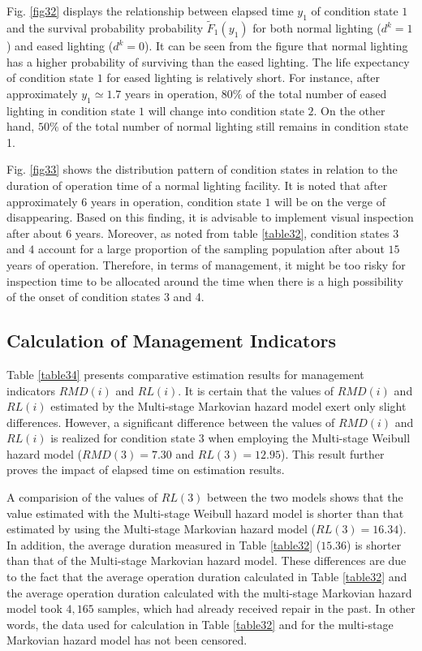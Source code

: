 Fig. \ref{fig32} displays the relationship between elapsed time $y_1$ of condition state $1$ and the survival probability probability $\tilde{F}_1(y_1)$ for both normal lighting ($d^k=1$) and eased lighting ($d^k=0$). It can be seen from the figure that normal lighting has a higher probability of  surviving than the eased lighting. The life expectancy of condition state $1$ for eased lighting is relatively short. For instance, after approximately $y_1 \simeq 1.7$ years in operation, $80\%$ of the total number of eased lighting in condition state $1$ will change into condition state $2$. On the other hand, $50\%$ of the total number of normal lighting still remains in condition state 1.

Fig. \ref{fig33} shows the distribution pattern of condition states in relation to the duration of  operation time of a normal lighting facility. It is noted that after approximately $6$ years in operation, condition state $1$ will be on the verge of disappearing. Based on this finding, it is advisable to implement visual inspection after about 6 years. Moreover, as noted from table \ref{table32}, condition states $3$ and $4$ account for a large proportion of the sampling population after about $15$ years of operation. Therefore, in terms of management, it might be too risky for inspection time to be allocated around the time when there is a high possibility of the onset of condition states 3 and 4.
\subsection{Calculation of Management Indicators}
\label{353}
Table \ref{table34} presents comparative estimation results for management indicators $RMD(i)$ and $RL(i)$. It is certain that the values of $RMD(i)$ and $RL(i)$ estimated by the Multi-stage Markovian hazard model  exert only slight differences. However, a significant difference between the values of $RMD(i)$ and $RL(i)$ is realized for condition state $3$ when employing the Multi-stage Weibull hazard model ($RMD(3)=7.30$ and $RL(3)=12.95$). This result further proves the impact of elapsed time on estimation results. 

A comparision of the values of $RL(3)$ between the two models shows that the value estimated with the  Multi-stage Weibull hazard model is shorter than that estimated by using the Multi-stage Markovian hazard model ($RL(3) =16.34$). In addition, the average duration measured in Table \ref{table32} ($15.36$) is shorter than that of the Multi-stage Markovian hazard model. These differences are due to the fact that the average operation duration calculated in Table \ref{table32} and the average operation duration calculated with the multi-stage Markovian hazard model took $4,165$ samples, which had already received repair in the past. In other words, the data used for calculation in Table \ref{table32} and for the multi-stage Markovian hazard model has not been censored.

